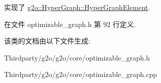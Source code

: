 实现了 \hyperlink{structg2o_1_1HyperGraph_1_1HyperGraphElement_a1a9d7b748698c09d202373e06e413ef2}{g2o\-::\-Hyper\-Graph\-::\-Hyper\-Graph\-Element}.



在文件 optimizable\-\_\-graph.\-h 第 92 行定义.



该类的文档由以下文件生成\-:\begin{DoxyCompactItemize}
\item 
Thirdparty/g2o/g2o/core/optimizable\-\_\-graph.\-h\item 
Thirdparty/g2o/g2o/core/optimizable\-\_\-graph.\-cpp\end{DoxyCompactItemize}
